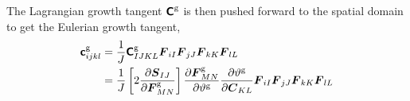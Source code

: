 \documentclass[10pt,letterpaper,oneside]{report}
\newcommand{\ten}[1]{\mbox{\boldmath $#1$}{}}
\newcommand{\tenf}[1]{\mbox{{\sffamily{\bfseries {#1}}}}}
\newcommand{\scas}[1]{\mbox{{\scriptsize{${\rm{#1}}$}}}{}}
\begin{document}
The Lagrangian growth tangent $\tenf{C}^{\scas{g}}$ is then pushed forward to the spatial domain to get the Eulerian growth tangent,
\begin{align}
\tenf{c}^{\scas{g}}_{ijkl} 
={}& \frac{1}{J} \tenf{C}^{\scas{g}}_{IJKL} \ten{F}_{iI} \ten{F}_{jJ} \ten{F}_{kK} \ten{F}_{lL} 
\\
={}& \frac{1}{J} \left[ 2 \frac{\partial \ten{S}_{IJ}}{\partial \ten{F}^{\scas{g}}_{MN}} \right] \frac{\partial \ten{F}^{\scas{g}}_{MN}}{\partial \vartheta^{\scas{g}}}  \frac{ \partial \vartheta^{\scas{g}} }{ \partial \ten{C}_{KL} } \ten{F}_{iI} \ten{F}_{jJ} \ten{F}_{kK} \ten{F}_{lL} 
\notag \\

\end{align}
\end{document}
